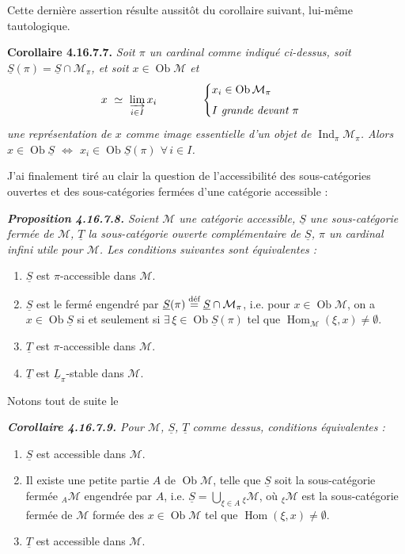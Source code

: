\documentclass[11pt]{article}
\newcommand{\msp}[1]{\marginpar{\footnotesize [#1]}}
\newcommand{\Ob}{\operatorname{Ob}}
\newcommand{\Hom}{\operatorname{Hom}}
\newcommand{\Ind}{\operatorname{Ind}}
\newcommand{\cM}{\mathcal{M}}
\newcommand{\uS}{\underline{S}}
\newcommand{\uT}{\underline{T}}
\begin{document}
Cette dernière assertion résulte aussitôt du corollaire suivant, lui-même tautologique.

\textbf{Corollaire 4.16.7.7.} \textit{Soit $\pi$ un cardinal comme indiqué ci-dessus, soit $\uS(\pi) = \uS \cap \cM_\pi$, et soit $x \in \Ob \cM$ et
\[
x \ \simeq\ \varinjlim_{i\in I} x_i \qquad\qquad
\begin{cases}
x_i \in \Ob \cM_\pi \\[1ex]
I \ \textit{grande devant}\ \pi
\end{cases}
\]
une représentation de $x$ comme image essentielle d'un objet de $\Ind_\pi \cM_\pi$. Alors $x \in \Ob \uS$ $\Longleftrightarrow$ $x_i \in \Ob \uS(\pi)$ $\forall\, i \in I$.}

\msp{page 487}
J'ai finalement tiré au clair la question de l'accessibilité des sous-catégories ouvertes et des sous-catégories fermées d'une catégorie accessible :

\begingroup\itshape
\noindent\textbf{\upshape Proposition 4.16.7.8.} Soient $\cM$ une catégorie accessible, $\uS$ une sous-catégorie fermée de $\cM$, $\uT$ la sous-catégorie ouverte complémentaire de $\uS$, $\pi$ un cardinal infini utile pour $\cM$. Les conditions suivantes sont équivalentes :
\begin{enumerate}[label={}]
\item[a)] $\uS$ est $\pi$-accessible dans $\cM$.
\item[a$'$)] $\uS$ est le fermé engendré par $\uS(\pi) \overset{\text{\upshape déf}}{=} \uS \cap \cM_\pi$, i.e. pour $x \in \Ob \cM$, on a $x \in \Ob \uS$ si et seulement si $\exists\, \xi \in \Ob \uS(\pi)$ tel que $\Hom_{\cM}(\xi, x) \neq \emptyset$.
\item[b)] $\uT$ est $\pi$-accessible dans $\cM$.
\item[b$'$)] $\uT$ est $\underline{L}_\pi$-stable dans $\cM$.
\end{enumerate}
\endgroup

\noindent Notons tout de suite le

\begingroup\itshape
\noindent\textbf{\upshape Corollaire 4.16.7.9.} Pour $\cM$, $\uS$, $\uT$ comme dessus, conditions équivalentes :
\begin{enumerate}[label={}]
\item[a)] $\uS$ est accessible dans $\cM$.
\item[a$'$)] Il existe une \textup{petite} partie $A$ de $\Ob \cM$, telle que $\uS$ soit la sous-catégorie fermée ${}_A\cM$ engendrée par $A$, i.e. $\uS = \bigcup_{\xi\in A} {}_\xi\cM$, où ${}_\xi\cM$ est la sous-catégorie fermée de $\cM$ formée des $x \in \Ob \cM$ tel que $\Hom(\xi, x) \neq \emptyset$.
\item[b)] \msp{page 488}$\uT$ est accessible dans $\cM$.
\end{enumerate}
\endgroup
\end{document}
